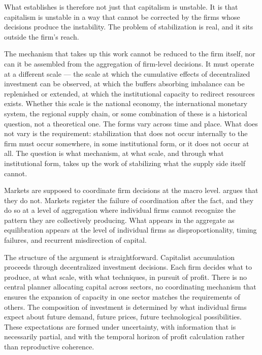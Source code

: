 What \citet{Shaikh2016} establishes is therefore not just that capitalism is unstable. It is that capitalism is unstable in a way that cannot be corrected by the firms whose decisions produce the instability. The problem of stabilization is real, and it sits outside the firm's reach.

The mechanism that takes up this work cannot be reduced to the firm itself, nor can it be assembled from the aggregation of firm-level decisions. It must operate at a different scale — the scale at which the cumulative effects of decentralized investment can be observed, at which the buffers absorbing imbalance can be replenished or extended, at which the institutional capacity to redirect resources exists. Whether this scale is the national economy, the international monetary system, the regional supply chain, or some combination of these is a historical question, not a theoretical one. The forms vary across time and place. What does not vary is the requirement: stabilization that does not occur internally to the firm must occur somewhere, in some institutional form, or it does not occur at all. The question is what mechanism, at what scale, and through what institutional form, takes up the work of stabilizing what the supply side itself cannot.

Markets are supposed to coordinate firm decisions at the macro level. \citet{Okishio2022} argues that they do not. Markets register the failure of coordination after the fact, and they do so at a level of aggregation where individual firms cannot recognize the pattern they are collectively producing. What appears in the aggregate as equilibration appears at the level of individual firms as disproportionality, timing failures, and recurrent misdirection of capital.

The structure of the argument is straightforward. Capitalist accumulation proceeds through decentralized investment decisions. Each firm decides what to produce, at what scale, with what techniques, in pursuit of profit. There is no central planner allocating capital across sectors, no coordinating mechanism that ensures the expansion of capacity in one sector matches the requirements of others. The composition of investment is determined by what individual firms expect about future demand, future prices, future technological possibilities. These expectations are formed under uncertainty, with information that is necessarily partial, and with the temporal horizon of profit calculation rather than reproductive coherence.

